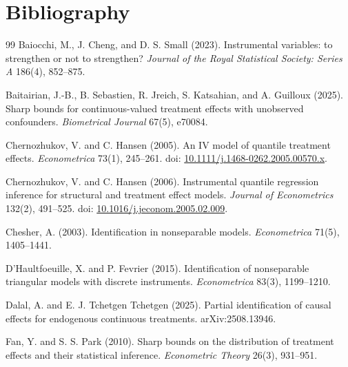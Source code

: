 \documentclass[11pt]{article}
\theoremstyle{definition}
\theoremstyle{plain}
\theoremstyle{remark}
\begin{document}
\section*{Bibliography}
\begin{thebibliography}{99}
Baiocchi, M., J. Cheng, and D. S. Small (2023).
\newblock Instrumental variables: to strengthen or not to strengthen?
\newblock \emph{Journal of the Royal Statistical Society: Series A} 186(4), 852--875.

Baitairian, J.-B., B. Sebastien, R. Jreich, S. Katsahian, and A. Guilloux (2025).
\newblock Sharp bounds for continuous-valued treatment effects with unobserved confounders.
\newblock \emph{Biometrical Journal} 67(5), e70084.

Chernozhukov, V. and C. Hansen (2005).
\newblock An IV model of quantile treatment effects.
\newblock \emph{Econometrica} 73(1), 245--261.
\newblock doi: \href{https://doi.org/10.1111/j.1468-0262.2005.00570.x}{10.1111/j.1468-0262.2005.00570.x}.

Chernozhukov, V. and C. Hansen (2006).
\newblock Instrumental quantile regression inference for structural and treatment effect models.
\newblock \emph{Journal of Econometrics} 132(2), 491--525.
\newblock doi: \href{https://doi.org/10.1016/j.jeconom.2005.02.009}{10.1016/j.jeconom.2005.02.009}.

Chesher, A. (2003).
\newblock Identification in nonseparable models.
\newblock \emph{Econometrica} 71(5), 1405--1441.

D'Haultfoeuille, X. and P. Fevrier (2015).
\newblock Identification of nonseparable triangular models with discrete instruments.
\newblock \emph{Econometrica} 83(3), 1199--1210.

Dalal, A. and E. J. Tchetgen Tchetgen (2025).
\newblock Partial identification of causal effects for endogenous continuous treatments.
\newblock arXiv:2508.13946.

Fan, Y. and S. S. Park (2010).
\newblock Sharp bounds on the distribution of treatment effects and their statistical inference.
\newblock \emph{Econometric Theory} 26(3), 931--951.


\end{thebibliography}
\end{document}
